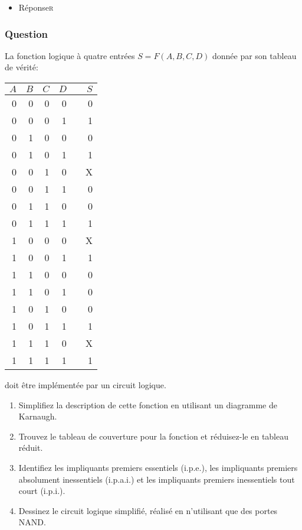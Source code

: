 \documentclass[11pt]{article}
\begin{document}
\begin{itemize}
\item Réponse\hfill{}\textsc{r}
\label{sec:org30fdbee}
\end{itemize}

\subsubsection*{Question}
\label{sec:org4aeec84}
La fonction logique à quatre entrées \(S = F(A,B,C, D)\) donnée par son 
  tableau de vérité:
\begin{center}
\begin{tabular}{rrrrlr}
\(A\) & \(B\) & \(C\) & \(D\) &  & \(S\)\\
\hline
0 & 0 & 0 & 0 &  & 0\\
0 & 0 & 0 & 1 &  & 1\\
0 & 1 & 0 & 0 &  & 0\\
0 & 1 & 0 & 1 &  & 1\\
0 & 0 & 1 & 0 &  & X\\
0 & 0 & 1 & 1 &  & 0\\
0 & 1 & 1 & 0 &  & 0\\
0 & 1 & 1 & 1 &  & 1\\
1 & 0 & 0 & 0 &  & X\\
1 & 0 & 0 & 1 &  & 1\\
1 & 1 & 0 & 0 &  & 0\\
1 & 1 & 0 & 1 &  & 0\\
1 & 0 & 1 & 0 &  & 0\\
1 & 0 & 1 & 1 &  & 1\\
1 & 1 & 1 & 0 &  & X\\
1 & 1 & 1 & 1 &  & 1\\
\end{tabular}
\end{center}
doit être implémentée par un circuit logique.

\begin{enumerate}
\item Simplifiez la description de cette fonction en utilisant un diagramme de Karnaugh.

\item Trouvez le tableau de couverture pour la fonction et réduisez-le en tableau réduit.

\item Identifiez les impliquants premiers essentiels (i.p.e.), les
impliquants premiers absolument inessentiels (i.p.a.i.) et les
impliquants premiers inessentiels tout court (i.p.i.).

\item Dessinez le circuit logique simplifié, réalisé en n'utilisant que des portes NAND.
\end{enumerate}
\end{document}
